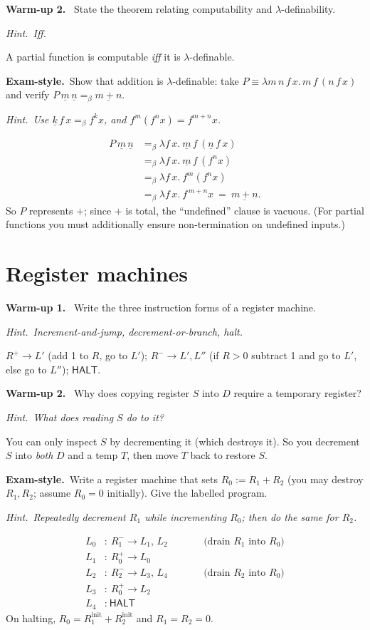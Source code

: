 \documentclass[11pt,a4paper]{article}
\newcommand{\hint}[1]{\par{\small\textcolor{accent}{\textit{Hint.}}\ \textit{#1}}\par\smallskip}
\newcommand{\warm}[1]{\smallskip\textbf{\textcolor{hi}{Warm-up #1.}}\ }
\newcommand{\exam}{\smallskip\textbf{\textcolor{warn}{Exam-style.}}\ }
\newcommand{\cn}[1]{\underline{#1}}
\newcommand{\lam}{\lambda}
\newcommand{\beq}{=_\beta}
\begin{document}
\warm{2} State the theorem relating computability and $\lambda$-definability.
\hint{Iff.}
\begin{sol}A partial function is computable \emph{iff} it is $\lambda$-definable.\end{sol}

\exam Show that addition is $\lambda$-definable: take $P\equiv\lam m\,n\,f\,x.\,m\,f\,(n\,f\,x)$ and verify $P\,\cn m\,\cn n\beq\cn{m{+}n}$.
\hint{Use $\cn k\,f\,x\beq f^k x$, and $f^m(f^n x)=f^{m+n}x$.}
\begin{sol}
\[
\begin{aligned}
P\,\cn m\,\cn n
&\beq \lam f\,x.\ \cn m\,f\,(\cn n\,f\,x)\\
&\beq \lam f\,x.\ \cn m\,f\,(f^{n}x)\\
&\beq \lam f\,x.\ f^{m}(f^{n}x)\\
&\beq \lam f\,x.\ f^{\,m+n}x\ =\ \cn{m{+}n}.
\end{aligned}
\]
So $P$ represents $+$; since $+$ is total, the ``undefined'' clause is vacuous. (For partial functions you must additionally ensure non-termination on undefined inputs.)
\end{sol}

\section{Register machines}

\warm{1} Write the three instruction forms of a register machine.
\hint{Increment-and-jump, decrement-or-branch, halt.}
\begin{sol}$R^{+}\to L'$ (add 1 to $R$, go to $L'$); $R^{-}\to L',L''$ (if $R{>}0$ subtract 1 and go to $L'$, else go to $L''$); $\textsf{HALT}$.\end{sol}

\warm{2} Why does copying register $S$ into $D$ require a temporary register?
\hint{What does reading $S$ do to it?}
\begin{sol}You can only inspect $S$ by decrementing it (which destroys it). So you decrement $S$ into \emph{both} $D$ and a temp $T$, then move $T$ back to restore $S$.\end{sol}

\exam Write a register machine that sets $R_0 := R_1 + R_2$ (you may destroy $R_1,R_2$; assume $R_0=0$ initially). Give the labelled program.
\hint{Repeatedly decrement $R_1$ while incrementing $R_0$; then do the same for $R_2$.}
\begin{sol}
\[
\begin{aligned}
L_0&:\ R_1^{-}\to L_1,\,L_2 \qquad &&\text{(drain }R_1\text{ into }R_0)\\
L_1&:\ R_0^{+}\to L_0\\
L_2&:\ R_2^{-}\to L_3,\,L_4 \qquad &&\text{(drain }R_2\text{ into }R_0)\\
L_3&:\ R_0^{+}\to L_2\\
L_4&:\ \textsf{HALT}
\end{aligned}
\]
On halting, $R_0=R_1^{\text{init}}+R_2^{\text{init}}$ and $R_1=R_2=0$.
\end{sol}
\end{document}
